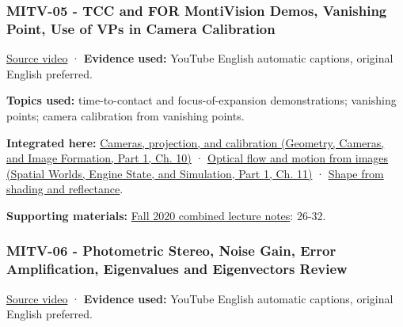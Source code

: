 \subsubsection{MITV-05 - TCC and FOR MontiVision Demos, Vanishing Point, Use of VPs in Camera Calibration}\label{04-visual-computing-ii-ch036-mitv-05---tcc-and-for-montivision-demos-vanishing-point-use-of-vps-in-camera-calibration}

\hypertarget{04-visual-computing-ii-ch036-mitv-05---tcc-and-for-montivision-demos-vanishing-point-use-of-vps-in-camera-calibration}{}

\href{https://www.youtube.com/watch?v=SSlPV1iYjHw}{Source video} · \textbf{Evidence used:} YouTube English automatic captions, original English preferred.

\textbf{Topics used:} time-to-contact and focus-of-expansion demonstrations; vanishing points; camera calibration from vanishing points.

\textbf{Integrated here:} \href{../03-Geometry-Cameras-and-Image-Formation-P01/main.pdf\#03-visual-computing-i-ch003-cameras-projection-and-calibration}{Cameras, projection, and calibration (Geometry, Cameras, and Image Formation, Part 1, Ch. 10)} · \href{../05-Spatial-Worlds-Engine-State-and-Simulation-P01/main.pdf\#04-visual-computing-ii-ch030-optical-flow-and-motion-from-images}{Optical flow and motion from images (Spatial Worlds, Engine State, and Simulation, Part 1, Ch. 11)} · \hyperref[04-visual-computing-ii-ch032-shape-from-shading-and-reflectance]{Shape from shading and reflectance}.

\textbf{Supporting materials:} \href{https://ocw.mit.edu/courses/6-801-machine-vision-fall-2020/9ec44f69e72995c370b3797818ba01e6_MIT6_801F20_lectureNotes.pdf}{Fall 2020 combined lecture notes}: 26-32.

\subsubsection{MITV-06 - Photometric Stereo, Noise Gain, Error Amplification, Eigenvalues and Eigenvectors Review}\label{04-visual-computing-ii-ch036-mitv-06---photometric-stereo-noise-gain-error-amplification-eigenvalues-and-eigenvectors-review}

\hypertarget{04-visual-computing-ii-ch036-mitv-06---photometric-stereo-noise-gain-error-amplification-eigenvalues-and-eigenvectors-review}{}

\href{https://www.youtube.com/watch?v=OOrT17RsVxE}{Source video} · \textbf{Evidence used:} YouTube English automatic captions, original English preferred.

